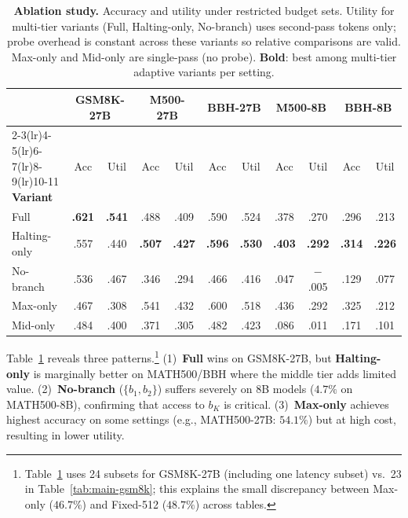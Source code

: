 \begin{table}[t]
\centering
\caption{\textbf{Ablation study.} Accuracy and utility under restricted budget sets. Utility for multi-tier variants (Full, Halting-only, No-branch) uses second-pass tokens only; probe overhead is constant across these variants so relative comparisons are valid. Max-only and Mid-only are single-pass (no probe). \textbf{Bold}: best among multi-tier adaptive variants per setting.}
\label{tab:ablation}
\footnotesize
\setlength{\tabcolsep}{3.5pt}
\begin{tabular}{@{}lcccccccccc@{}}
\toprule
& \multicolumn{2}{c}{\textbf{GSM8K-27B}} & \multicolumn{2}{c}{\textbf{M500-27B}} & \multicolumn{2}{c}{\textbf{BBH-27B}} & \multicolumn{2}{c}{\textbf{M500-8B}} & \multicolumn{2}{c}{\textbf{BBH-8B}} \\
\cmidrule(lr){2-3}\cmidrule(lr){4-5}\cmidrule(lr){6-7}\cmidrule(lr){8-9}\cmidrule(lr){10-11}
\textbf{Variant} & Acc & Util & Acc & Util & Acc & Util & Acc & Util & Acc & Util \\
\midrule
Full & \textbf{.621} & \textbf{.541} & .488 & .409 & .590 & .524 & .378 & .270 & .296 & .213 \\
Halting-only & .557 & .440 & \textbf{.507} & \textbf{.427} & \textbf{.596} & \textbf{.530} & \textbf{.403} & \textbf{.292} & \textbf{.314} & \textbf{.226} \\
No-branch & .536 & .467 & .346 & .294 & .466 & .416 & .047 & $-$.005 & .129 & .077 \\
\arrayrulecolor{gray}\midrule\arrayrulecolor{black}
Max-only & .467 & .308 & .541 & .432 & .600 & .518 & .436 & .292 & .325 & .212 \\
Mid-only & .484 & .400 & .371 & .305 & .482 & .423 & .086 & .011 & .171 & .101 \\
\bottomrule
\end{tabular}
\end{table}

Table~\ref{tab:ablation} reveals three patterns.\footnote{Table~\ref{tab:ablation} uses 24 subsets for GSM8K-27B (including one latency subset) vs.\ 23 in Table~\ref{tab:main-gsm8k}; this explains the small discrepancy between Max-only ($46.7\%$) and Fixed-512 ($48.7\%$) across tables.}
(1)~\textbf{Full} wins on GSM8K-27B, but \textbf{Halting-only} is marginally better on MATH500/BBH where the middle tier adds limited value.
(2)~\textbf{No-branch} ($\{b_1, b_2\}$) suffers severely on 8B models ($4.7\%$ on MATH500-8B), confirming that access to $b_K$ is critical.
(3)~\textbf{Max-only} achieves highest accuracy on some settings (e.g., MATH500-27B: $54.1\%$) but at high cost, resulting in lower utility.

